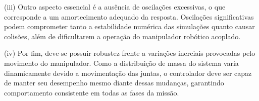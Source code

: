 (iii) Outro aspecto essencial é a ausência de oscilações excessivas, o que corresponde a um amortecimento adequado da resposta. Oscilações significativas podem comprometer tanto a estabilidade numérica das simulações quanto causar colisões, além de dificultarem a operação do manipulador robótico acoplado.

(iv) Por fim, deve-se possuir robustez frente a variações inerciais provocadas pelo movimento do manipulador. Como a distribuição de massa do sistema varia dinamicamente devido a movimentação das juntas, o controlador deve ser capaz de manter seu desempenho mesmo diante dessas mudanças, garantindo comportamento consistente em todas as fases da missão.